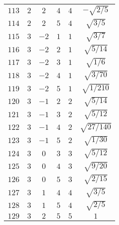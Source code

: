\begin{table}
\begin{center}
\begin{tabular}{|c|c|c|c|c|c|}
$113$ & $2$ & $2$ & $4$ & $4$ & $-\sqrt{2/5}$ \\ 
$114$ & $2$ & $2$ & $5$ & $4$ & $\sqrt{3/5}$ \\ 
$115$ & $3$ & $-2$ & $1$ & $1$ & $\sqrt{3/7}$ \\ 
$116$ & $3$ & $-2$ & $2$ & $1$ & $\sqrt{5/14}$ \\ 
$117$ & $3$ & $-2$ & $3$ & $1$ & $\sqrt{1/6}$ \\ 
$118$ & $3$ & $-2$ & $4$ & $1$ & $\sqrt{3/70}$ \\ 
$119$ & $3$ & $-2$ & $5$ & $1$ & $\sqrt{1/210}$ \\ 
$120$ & $3$ & $-1$ & $2$ & $2$ & $\sqrt{5/14}$ \\ 
$121$ & $3$ & $-1$ & $3$ & $2$ & $\sqrt{5/12}$ \\ 
$122$ & $3$ & $-1$ & $4$ & $2$ & $\sqrt{27/140}$ \\ 
$123$ & $3$ & $-1$ & $5$ & $2$ & $\sqrt{1/30}$ \\ 
$124$ & $3$ & $0$ & $3$ & $3$ & $\sqrt{5/12}$ \\ 
$125$ & $3$ & $0$ & $4$ & $3$ & $\sqrt{9/20}$ \\ 
$126$ & $3$ & $0$ & $5$ & $3$ & $\sqrt{2/15}$ \\ 
$127$ & $3$ & $1$ & $4$ & $4$ & $\sqrt{3/5}$ \\ 
$128$ & $3$ & $1$ & $5$ & $4$ & $\sqrt{2/5}$ \\ 
$129$ & $3$ & $2$ & $5$ & $5$ & $1$ \\ 
\hline 
\end{tabular}
\end{center}
\end{table}

